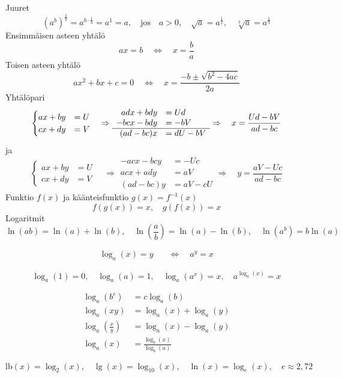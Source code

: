 \documentclass[12pt]{article}
\begin{document}
Juuret
$$
(a^b)^{\frac{1}{b}}=a^{b\cdot \frac{1}{b}}=a^1=a,\quad\textrm{jos}\quad a>0,\quad 
\sqrt{a}=a^{\frac{1}{2}},\quad \sqrt[3]{a}=a^{\frac{1}{3}}
$$
Ensimmäisen asteen yhtälö
$$
ax=b\quad\Leftrightarrow\quad x=\frac{b}{a}
$$
Toisen asteen yhtälö
$$
ax^2+bx+c=0\quad\Leftrightarrow\quad x=\frac{-b\pm\sqrt{b^2-4ac}}{2a}
$$
Yhtälöpari
$$
\begin{cases}
ax+by&=U\\
cx+dy&=V
\end{cases}\quad\Rightarrow
\begin{array}{rl}
adx+bdy&=Ud\\
-bcx-bdy&=-bV\\
\hline
(ad-bc)x&=dU-bV
\end{array}\Rightarrow\quad x=\frac{Ud-bV}{ad-bc}\\
$$
ja
$$
\begin{cases}
ax+by&=U\\
cx+dy&=V
\end{cases}\quad\Rightarrow
\begin{array}{rl}
-acx-bcy&=-Uc\\
acx+ady&=aV\\
\hline
(ad-bc)y&=aV-cU
\end{array}\Rightarrow\quad  y=\frac{aV-Uc}{ad-bc}
$$
Funktio $f(x)$ ja käänteisfunktio $g(x)=f^{-1}(x)$
$$
f(g(x))=x,\quad
g(f(x))=x
$$
Logaritmit
$$
\ln(ab)=\ln(a)+\ln(b),\quad
\ln(\frac{a}{b})=\ln(a)-\ln(b),\quad
\ln(a^b)=b\ln(a)
$$


\begin{equation*}
\begin{split}
\log_a(x)=y\quad&\Leftrightarrow\quad a^y=x
\end{split}
\end{equation*}


$$
\log_a(1)=0,\quad
\log_a(a)=1,\quad
\log_a(a^x)=x,\quad
a^{\log_a(x)}=x
$$

\begin{equation*}
\begin{split}
\log_a(b^c)&=c\log_a(b)\\
\log_a(xy)&=\log_a(x)+\log_a(y)\\
\log_a\left(\frac{x}{y}\right)
&=\log_a(x)-\log_a(y)\\
\log_a(x)&=\frac{\log_b(x)}{\log_b(a)}
\end{split}
\end{equation*}

$$
\textrm{lb}(x)=\log_2(x),\quad
\lg(x)=\log_{10}(x),\quad
\ln(x)=\log_e(x),\quad
e\approx 2,72
$$
\end{document}
